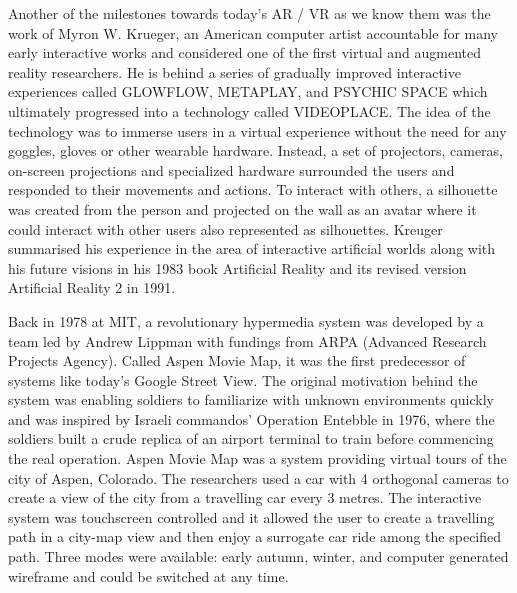 \documentclass[12pt, a4paper]{article}
\begin{document}

Another of the milestones towards today’s AR / VR as we know them was the work of Myron W. Krueger, an American computer artist accountable for many early interactive works and considered one of the first virtual and augmented reality researchers. He is behind a series of gradually improved interactive experiences called GLOWFLOW, METAPLAY, and PSYCHIC SPACE which ultimately progressed into a technology called VIDEOPLACE. The idea of the technology was to immerse users in a virtual experience without the need for any goggles, gloves or other wearable hardware. Instead, a set of projectors, cameras, on-screen projections and specialized hardware surrounded the users and responded to their movements and actions. To interact with others, a silhouette was created from the person and projected on the wall as an avatar where it could interact with other users also represented as silhouettes. Kreuger summarised his experience in the area of interactive artificial worlds along with his future visions in his 1983 book Artificial Reality and its revised version Artificial Reality 2 in 1991.

Back in 1978 at MIT, a revolutionary hypermedia system was developed by a team led by Andrew Lippman with fundings from ARPA (Advanced Research Projects Agency). Called Aspen Movie Map, it was the first predecessor of systems like today’s Google Street View. The original motivation behind the system was enabling soldiers to familiarize with unknown environments quickly and was inspired by Israeli commandos’ Operation Entebble in 1976, where the soldiers built a crude replica of an airport terminal to train before commencing the real operation. Aspen Movie Map was a system providing virtual tours of the city of Aspen, Colorado. The researchers used a car with 4 orthogonal cameras to create a view of the city from a travelling car every 3 metres. The interactive system was touchscreen controlled and it allowed the user to create a travelling path in a city-map view and then enjoy a surrogate car ride among the specified path. Three modes were available: early autumn, winter, and computer generated wireframe and could be switched at any time.
\end{document}
